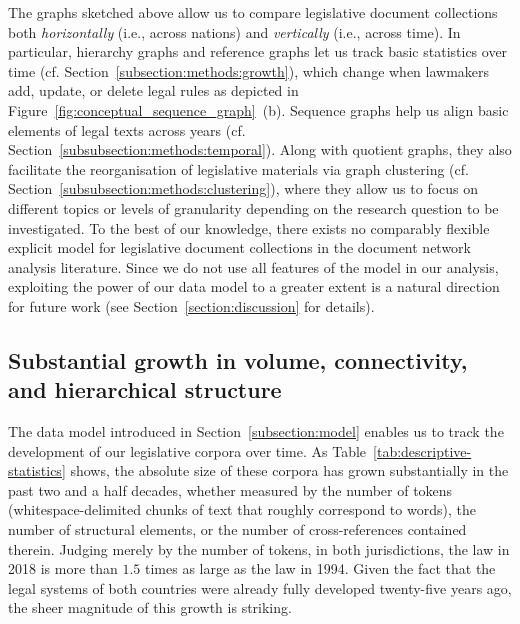 The graphs sketched above allow us to compare legislative document collections both \emph{horizontally} (i.e., across nations) and \emph{vertically} (i.e., across time).
In particular, hierarchy graphs and reference graphs let us track basic statistics over time (cf. Section~\ref{subsection:methods:growth}), 
which change when lawmakers add, update, or delete legal rules as depicted in Figure~\ref{fig:conceptual_sequence_graph}~(b).
Sequence graphs help us align basic elements of legal texts across years (cf. Section~\ref{subsubsection:methods:temporal}).
Along with quotient graphs, they also facilitate the reorganisation of legislative materials via graph clustering (cf. Section~\ref{subsubsection:methods:clustering}), 
where they allow us to focus on different topics or levels of granularity depending on the research question to be investigated.
To the best of our knowledge, there exists no comparably flexible explicit model for legislative document collections in the document network analysis literature. 
Since we do not use all features of the model in our analysis, 
exploiting the power of our data model to a greater extent is a natural direction for future work (see Section~\ref{section:discussion} for details).

\subsection{Substantial growth in volume, connectivity, and hierarchical structure}
\label{subsection:growth}

The data model introduced in Section~\ref{subsection:model} enables us to track the development of our legislative corpora over time. 
As Table~\ref{tab:descriptive-statistics} shows, the absolute size of these corpora has grown substantially in the past two and a half decades, 
whether measured by the number of tokens (whitespace-delimited chunks of text that roughly correspond to words), 
the number of structural elements, or the number of cross-references contained therein. 
Judging merely by the number of tokens, 
in both jurisdictions,
the law in 2018 is more than $1.5$ times as large as the law in 1994. 
Given the fact that the legal systems of both countries were already fully developed twenty-five years ago, 
the sheer magnitude of this growth is striking. 

